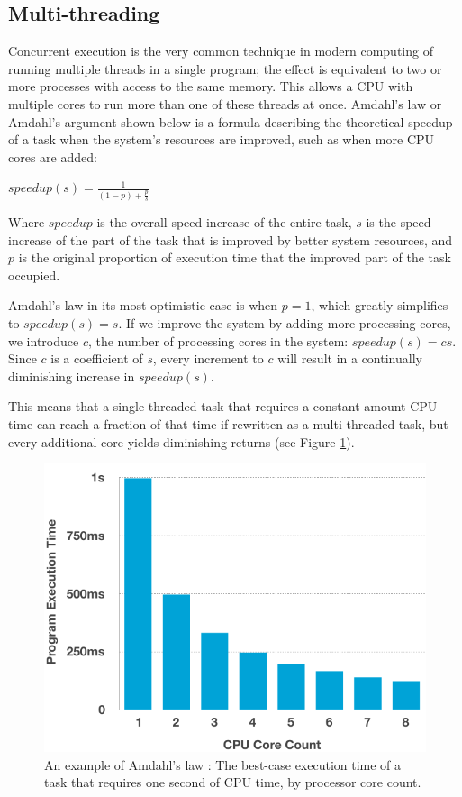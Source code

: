 \documentclass[11pt, a4paper, twocolumn]{article}
\begin{document}
\subsection{Multi-threading}

Concurrent execution is the very common technique in modern computing of running multiple threads in a single program; the effect is equivalent to two or more processes with access to the same memory. This allows a CPU with multiple cores to run more than one of these threads at once. Amdahl's law or Amdahl's argument \citep{Rodgers1985} shown below is a formula describing the theoretical speedup of a task when the system's resources are improved, such as when more CPU cores are added:

\begin{center}
\begin{Large}
$speedup(s) = \frac{1}{(1-p)+\frac{p}{s}}$
\end{Large}
\end{center}

Where $speedup$ is the overall speed increase of the entire task, $s$ is the speed increase of the part of the task that is improved by better system resources, and $p$ is the original proportion of execution time that the improved part of the task occupied.

Amdahl's law in its most optimistic case is when $p = 1$, which greatly simplifies to $speedup(s) = s$. If we improve the system by adding more processing cores, we introduce $c$, the number of processing cores in the system: $speedup(s) = cs$. Since $c$ is a coefficient of $s$, every increment to $c$ will result in a continually diminishing increase in $speedup(s)$.

This means that a single-threaded task that requires a constant amount CPU time can reach a fraction of that time if rewritten as a multi-threaded task, but every additional core yields diminishing returns (see Figure \ref{fig:cpu_cores}).

\begin{figure}[h]
\includegraphics[width=\linewidth]{cpu_cores}
\caption{An example of Amdahl's law \citep{Rodgers1985}: The best-case execution time of a task that requires one second of CPU time, by processor core count.}
\label{fig:cpu_cores}
\end{figure}
\end{document}
